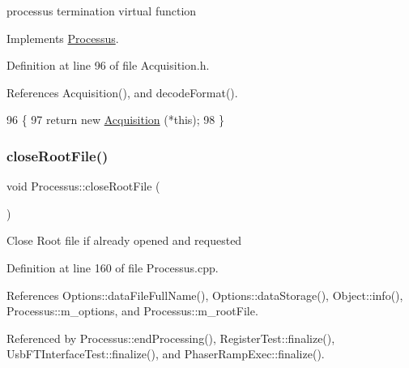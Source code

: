 processus termination virtual function 

Implements \hyperlink{classProcessus_aca8856f6d6d7b7e1fe941f298dcbb502}{Processus}.



Definition at line 96 of file Acquisition.\+h.



References Acquisition(), and decode\+Format().


\begin{DoxyCode}
96                       \{
97     \textcolor{keywordflow}{return} \textcolor{keyword}{new} \hyperlink{classAcquisition_aa7d3138495a4a8888c21b33f4d657732}{Acquisition} (*\textcolor{keyword}{this});
98   \}
\end{DoxyCode}
\mbox{\label{classProcessus_a2f3c41e99da4c738ea3d8f7b0d20a665}} 
\subsubsection{\texorpdfstring{close\+Root\+File()}{closeRootFile()}}
{\footnotesize\ttfamily void Processus\+::close\+Root\+File (\begin{DoxyParamCaption}{ }\end{DoxyParamCaption})\hspace{0.3cm}{\ttfamily [inherited]}}

Close Root file if already opened and requested 

Definition at line 160 of file Processus.\+cpp.



References Options\+::data\+File\+Full\+Name(), Options\+::data\+Storage(), Object\+::info(), Processus\+::m\+\_\+options, and Processus\+::m\+\_\+root\+File.



Referenced by Processus\+::end\+Processing(), Register\+Test\+::finalize(), Usb\+F\+T\+Interface\+Test\+::finalize(), and Phaser\+Ramp\+Exec\+::finalize().


